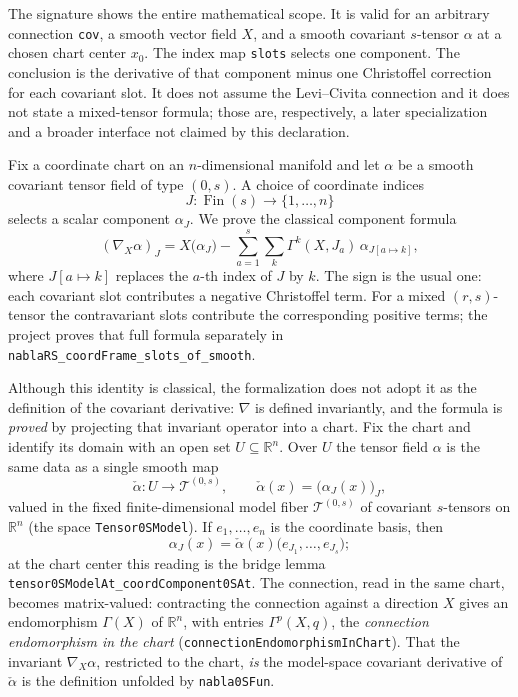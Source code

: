 \documentclass[11pt]{article}
\theoremstyle{plain}
\theoremstyle{definition}
\theoremstyle{remark}
\newcommand{\leanref}[1]{\nolinkurl{#1}}
\begin{document}
The signature shows the entire mathematical scope.  It is valid for an
arbitrary connection \texttt{cov}, a smooth vector field $X$, and a smooth
covariant $s$-tensor $\alpha$ at a chosen chart center $x_0$.  The index map
\texttt{slots} selects one component.  The conclusion is the derivative of
that component minus one Christoffel correction for each covariant slot.  It
does not assume the Levi--Civita connection and it does not state a mixed-tensor
formula; those are, respectively, a later specialization and a broader
interface not claimed by this declaration.

Fix a coordinate chart on an $n$-dimensional manifold and let $\alpha$ be a
smooth covariant tensor field of type $(0,s)$.  A choice of coordinate indices
\[
  J : \operatorname{Fin}(s) \to \{1,\ldots,n\}
\]
selects a scalar component $\alpha_J$.  We prove the classical component
formula
\[
  (\nabla_X \alpha)_J
  =
  X\bigl(\alpha_J\bigr)
  -
  \sum_{a=1}^{s}\sum_{k}
  \Gamma^k(X,J_a)\,\alpha_{J[a\mapsto k]},
\]
where $J[a\mapsto k]$ replaces the $a$-th index of $J$ by $k$.  The sign is
the usual one: each covariant slot contributes a negative Christoffel term.
For a mixed $(r,s)$-tensor the contravariant slots contribute the corresponding
positive terms; the project proves that full formula separately in
\leanref{nablaRS_coordFrame_slots_of_smooth}.

Although this identity is classical, the formalization does not adopt it as the
definition of the covariant derivative: $\nabla$ is defined invariantly, and the
formula is \emph{proved} by projecting that invariant operator into a chart.
Fix the chart and identify its domain with an open set $U\subseteq\mathbb R^n$.
Over $U$ the tensor field $\alpha$ is the same data as a single smooth map
\[
  \check \alpha : U \longrightarrow \mathcal T^{(0,s)},
  \qquad
  \check \alpha(x)=\bigl(\alpha_J(x)\bigr)_{J},
\]
valued in the fixed finite-dimensional model fiber $\mathcal T^{(0,s)}$ of
covariant $s$-tensors on $\mathbb R^n$ (the space \leanref{Tensor0SModel}).  If
$e_1,\ldots,e_n$ is the coordinate basis, then
\[
  \alpha_J(x)
  =\check \alpha(x)
    \bigl(e_{J_1},\ldots,e_{J_s}\bigr);
\]
at the chart center this reading is the bridge lemma
\leanref{tensor0SModelAt_coordComponent0SAt}.  The connection, read in the
same chart, becomes matrix-valued: contracting the connection against a
direction $X$ gives an endomorphism $\Gamma(X)$ of $\mathbb R^n$, with entries
$\Gamma^p(X,q)$, the \emph{connection endomorphism in the chart}
(\leanref{connectionEndomorphismInChart}).  That the invariant
$\nabla_X \alpha$, restricted to the chart, \emph{is} the model-space
covariant derivative of $\check \alpha$ is the definition unfolded by
\leanref{nabla0SFun}.
\end{document}
